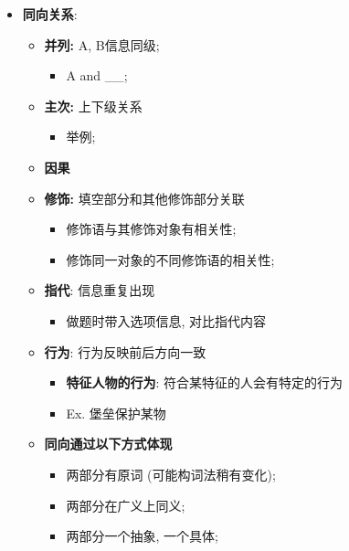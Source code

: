     \begin{itemize}
      \item \textbf{同向关系}:
      \begin{itemize}
        \item \textbf{并列:} A, B信息同级;
        \begin{itemize}
          \item A and \_\_;
        \end{itemize}

        \item \textbf{主次:} 上下级关系
        \begin{itemize}
          \item 举例;
        \end{itemize}

        \item \textbf{因果}
        \item \textbf{修饰:} 填空部分和其他修饰部分关联
        \begin{itemize}
          \item 修饰语与其修饰对象有相关性;
          \item 修饰同一对象的不同修饰语的相关性;
        \end{itemize}

        \item \textbf{指代}: 信息重复出现
        \begin{itemize}
          \item 做题时带入选项信息, 对比指代内容
        \end{itemize}

        \item \textbf{行为}: 行为反映前后方向一致
        \begin{itemize}
          \item \textbf{特征人物的行为}: 符合某特征的人会有特定的行为
          \item Ex. 堡垒保护某物
        \end{itemize}

        \item \textbf{同向通过以下方式体现}
        \begin{itemize}
          \item 两部分有原词 (可能构词法稍有变化);
          \item 两部分在广义上同义;
          \item 两部分一个抽象, 一个具体;
        \end{itemize}
      \end{itemize}
    \end{itemize}

